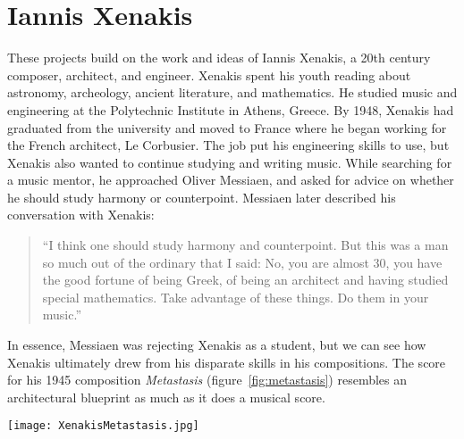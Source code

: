 \section{Iannis Xenakis}
\label{sec:iannis-xenakis}
These projects build on the work and ideas of Iannis Xenakis, a 20th
century composer, architect, and engineer. Xenakis spent his youth
reading about astronomy, archeology, ancient literature, and
mathematics.\cite[]{Hoffmann2015} He studied music and engineering at
the Polytechnic Institute in Athens, Greece. By 1948, Xenakis had
graduated from the university and moved to France where he began
working for the French architect, Le Corbusier. The job put his
engineering skills to use, but Xenakis also wanted to continue
studying and writing music. While searching for a music mentor, he
approached Oliver Messiaen, and asked for advice
on whether he should study harmony or counterpoint. Messiaen later
described his conversation with Xenakis:
\begin{quotation}``I think one should study harmony and
  counterpoint. But this was a man so much out of the ordinary that I
  said: No, you are almost 30, you have the good fortune of being
  Greek, of being an architect and having studied special
  mathematics. Take advantage of these things. Do them in your
  music.''\cite{Service2013}
\end{quotation}
In essence, Messiaen was rejecting Xenakis as a student, but we can
see how Xenakis ultimately drew from his disparate skills in his
compositions. The score for his 1945 composition \textit{Metastasis}
(figure~\ref{fig:metastasis}) resembles an architectural blueprint as
much as it does a musical score.

\begin{figure*}[h]
  \texttt{[image: XenakisMetastasis.jpg]}
  \caption{Excerpt from Iannis Xenakis' composition,
    \textit{Metastasis} (1954), measures 309-314. This score in this
    image was then transcribed to sheet music for the orchestral
    performance.}
  \label{fig:metastasis}
\end{figure*}

